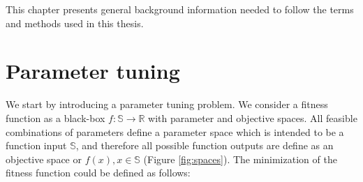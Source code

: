 
    This chapter presents general background information needed to follow the terms and methods used in this thesis. 

    \section{Parameter tuning}
        We start by introducing a parameter tuning problem. We consider a fitness function as a black-box $f : \mathbb{S} \rightarrow \mathbb{R}$ with parameter and objective spaces. All feasible combinations of parameters define a parameter space which is intended to be a function input $\mathbb{S}$, and therefore all possible function outputs are define as an objective space or $f(x), x \in \mathbb{S}$ (Figure \ref{fig:spaces}). The minimization of the fitness function could be defined as follows:


